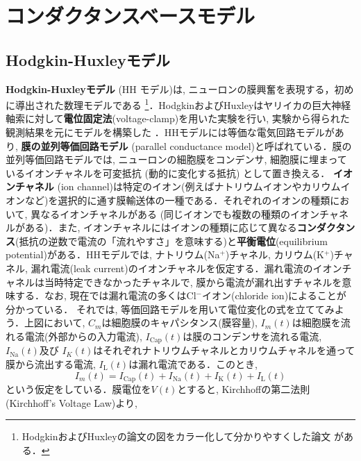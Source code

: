 \section{コンダクタンスベースモデル}
\subsection{Hodgkin-Huxleyモデル}
\textbf{Hodgkin-Huxleyモデル} (HH モデル)は, ニューロンの膜興奮を表現する，初めに導出された数理モデルである \citep{Hodgkin1952-gy}\footnote{HodgkinおよびHuxleyの論文の図をカラー化して分かりやすくした論文 \citep{Hopper2022-xj} がある．}．HodgkinおよびHuxleyはヤリイカの巨大神経軸索に対して\textbf{電位固定法}(voltage-clamp)を用いた実験を行い, 実験から得られた観測結果を元にモデルを構築した \citep{Schwiening2012-pi}．HHモデルには等価な電気回路モデルがあり, \textbf{膜の並列等価回路モデル} (parallel conductance model)と呼ばれている．膜の並列等価回路モデルでは, ニューロンの細胞膜をコンデンサ, 細胞膜に埋まっているイオンチャネルを可変抵抗 (動的に変化する抵抗) として置き換える．
\textbf{イオンチャネル} (ion channel)は特定のイオン(例えばナトリウムイオンやカリウムイオンなど)を選択的に通す膜輸送体の一種である．それぞれのイオンの種類において, 異なるイオンチャネルがある (同じイオンでも複数の種類のイオンチャネルがある)．また, イオンチャネルにはイオンの種類に応じて異なる\textbf{コンダクタンス}(抵抗の逆数で電流の「流れやすさ」を意味する)と\textbf{平衡電位}(equilibrium potential)がある．HHモデルでは, ナトリウム(Na$^{+}$)チャネル, カリウム(K$^{+}$)チャネル, 漏れ電流(leak current)のイオンチャネルを仮定する．漏れ電流のイオンチャネルは当時特定できなかったチャネルで, 膜から電流が漏れ出すチャネルを意味する．なお, 現在では漏れ電流の多くはCl$^{-}$イオン(chloride ion)によることが分かっている．
それでは, 等価回路モデルを用いて電位変化の式を立ててみよう．上図において, $C_m$は細胞膜のキャパシタンス(膜容量), $I_{m}(t)$は細胞膜を流れる電流(外部からの入力電流), $I_\text{Cap}(t)$は膜のコンデンサを流れる電流, $I_\text{Na}(t)$及び $I_K(t)$はそれぞれナトリウムチャネルとカリウムチャネルを通って膜から流出する電流, $I_\text{L}(t)$は漏れ電流である．このとき, 
\begin{equation}
I_{m}(t)=I_\text{Cap}(t)+I_\text{Na}(t)+I_\text{K}(t)+I_\text{L}(t)    
\end{equation}
という仮定をしている．膜電位を$V(t)$とすると, Kirchhoffの第二法則 (Kirchhoff's Voltage Law)より, 
